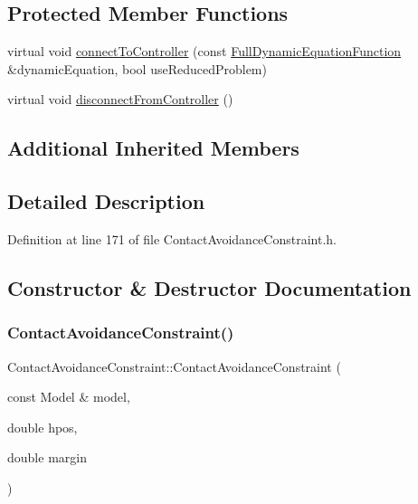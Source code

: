 \subsection*{Protected Member Functions}
\begin{DoxyCompactItemize}
\item 
virtual void \hyperlink{classocra_1_1ContactAvoidanceConstraint_a9beada2720203ab46265f271309a2ab5}{connect\+To\+Controller} (const \hyperlink{classocra_1_1FullDynamicEquationFunction}{Full\+Dynamic\+Equation\+Function} \&dynamic\+Equation, bool use\+Reduced\+Problem)
\item 
virtual void \hyperlink{classocra_1_1ContactAvoidanceConstraint_a884358568ff7f5510d26ff96915a4d8c}{disconnect\+From\+Controller} ()
\end{DoxyCompactItemize}
\subsection*{Additional Inherited Members}


\subsection{Detailed Description}


Definition at line 171 of file Contact\+Avoidance\+Constraint.\+h.



\subsection{Constructor \& Destructor Documentation}
\hypertarget{classocra_1_1ContactAvoidanceConstraint_a77ef6f814bddd8ff8eabb9cf1272b4a3}{}\label{classocra_1_1ContactAvoidanceConstraint_a77ef6f814bddd8ff8eabb9cf1272b4a3} 
\subsubsection{\texorpdfstring{Contact\+Avoidance\+Constraint()}{ContactAvoidanceConstraint()}}
{\footnotesize\ttfamily Contact\+Avoidance\+Constraint\+::\+Contact\+Avoidance\+Constraint (\begin{DoxyParamCaption}\item[{const Model \&}]{model,  }\item[{double}]{hpos,  }\item[{double}]{margin }\end{DoxyParamCaption})}



